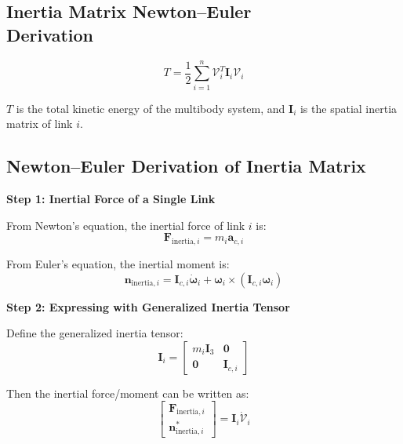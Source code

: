 \documentclass[12pt,a4paper]{report}
\newcommand{\newsymbols}[1]{\par\noindent{}#1\par\vspace{0.35em}}
\begin{document}
\subsection[Inertia Matrix Derivation]{Inertia Matrix Newton--Euler\\ Derivation}

\begin{equation}
T = \frac{1}{2} \sum_{i=1}^{n} \mathcal{V}_i^T \mathbf{I}_i \mathcal{V}_i
\label{eq:old-106}
\end{equation}
\newsymbols{$T$ is the total kinetic energy of the multibody system, and $\mathbf{I}_i$ is the spatial inertia matrix of link $i$.}

\subsection{Newton--Euler Derivation of Inertia Matrix}

\textbf{Step 1: Inertial Force of a Single Link}

From Newton's equation, the inertial force of link $i$ is:
\begin{equation}
\mathbf{F}_{\text{inertia},i} = m_i \mathbf{a}_{c,i}
\end{equation}

From Euler's equation, the inertial moment is:
\begin{equation}
\mathbf{n}_{\text{inertia},i}
=
\mathbf{I}_{c,i}\dot{\boldsymbol{\omega}}_i
+
\boldsymbol{\omega}_i \times (\mathbf{I}_{c,i}\boldsymbol{\omega}_i)
\end{equation}

\textbf{Step 2: Expressing with Generalized Inertia Tensor}

Define the generalized inertia tensor:
\begin{equation}
\mathbf{I}_i
=
\begin{bmatrix}
m_i \mathbf{I}_3 & \mathbf{0} \\
\mathbf{0} & \mathbf{I}_{c,i}
\end{bmatrix}
\end{equation}

Then the inertial force/moment can be written as:
\begin{equation}
\begin{bmatrix} \mathbf{F}_{\text{inertia},i} \\ \mathbf{n}_{\text{inertia},i}^* \end{bmatrix} = \mathbf{I}_i \dot{\mathcal{V}}_i
\end{equation}
\end{document}
